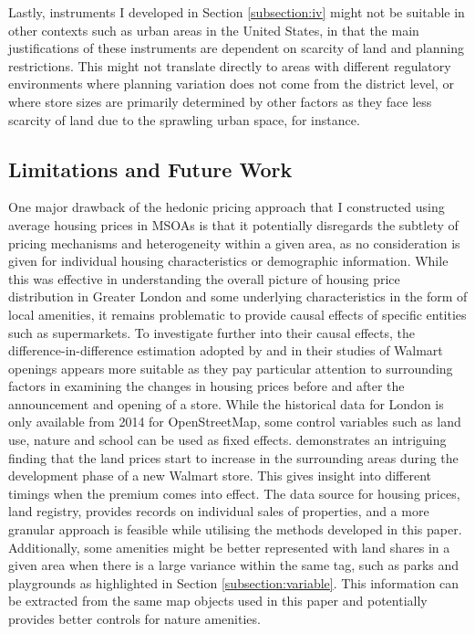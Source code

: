 \documentclass{article}
\begin{document}
Lastly, instruments I developed in Section \ref{subsection:iv} might not be suitable in other contexts such as urban areas in the United States, in that the main justifications of these instruments are dependent on scarcity of land and planning restrictions. This might not translate directly to areas with different regulatory environments where planning variation does not come from the district level, or where store sizes are primarily determined by other factors as they face less scarcity of land due to the sprawling urban space, for instance.

\subsection{Limitations and Future Work}  \label{subsection:limitations}
One major drawback of the hedonic pricing approach that I constructed using average housing prices in MSOAs is that it potentially disregards the subtlety of pricing mechanisms and heterogeneity within a given area, as no consideration is given for individual housing characteristics or demographic information. While this was effective in understanding the overall picture of housing price distribution in Greater London and some underlying characteristics in the form of local amenities, it remains problematic to provide causal effects of specific entities such as supermarkets. To investigate further into their causal effects, the difference-in-difference estimation adopted by \citet{Pope2015WhenAlways} and \citet{Slade2016Walmart} in their studies of Walmart openings appears more suitable as they pay particular attention to surrounding factors in examining the changes in housing prices before and after the announcement and opening of a store. While the historical data for London is only available from 2014 for OpenStreetMap, some control variables such as land use, nature and school can be used as fixed effects. \citet{Slade2016Walmart} demonstrates an intriguing finding that the land prices start to increase in the surrounding areas during the development phase of a new Walmart store. This gives insight into different timings when the premium comes into effect. The data source for housing prices, land registry, provides records on individual sales of properties, and a more granular approach is feasible while utilising the methods developed in this paper. Additionally, some amenities might be better represented with land shares in a given area when there is a large variance within the same tag, such as parks and playgrounds as highlighted in Section \ref{subsection:variable}. This information can be extracted from the same map objects used in this paper and potentially provides better controls for nature amenities. 
\end{document}
